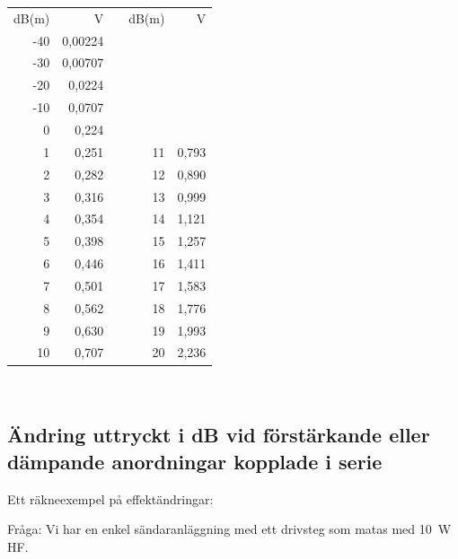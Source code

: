 \begin{tabular}{r|rp{1cm}r|r}
	dB(m) &       V &  & dB(m) &     V \\ \cline{1-2}\cline{4-5}
	-40   & 0,00224 &  &       &  \\
	-30   & 0,00707 &  &       &  \\
	-20   &  0,0224 &  &       &  \\
	-10   &  0,0707 &  &       &  \\
	0     &   0,224 &  &       &  \\
	1     &   0,251 &  & 11    & 0,793 \\
	2     &   0,282 &  & 12    & 0,890 \\
	3     &   0,316 &  & 13    & 0,999 \\
	4     &   0,354 &  & 14    & 1,121 \\
	5     &   0,398 &  & 15    & 1,257 \\
	6     &   0,446 &  & 16    & 1,411 \\
	7     &   0,501 &  & 17    & 1,583 \\
	8     &   0,562 &  & 18    & 1,776 \\
	9     &   0,630 &  & 19    & 1,993 \\
	10    &   0,707 &  & 20    & 2,236
\end{tabular}\\


\subsection{Ändring uttryckt i dB vid förstärkande eller dämpande anordningar kopplade i serie}

Ett räkneexempel på effektändringar:

Fråga: Vi har en enkel sändaranläggning med ett drivsteg som matas med 
\SI{10}{W} HF.

